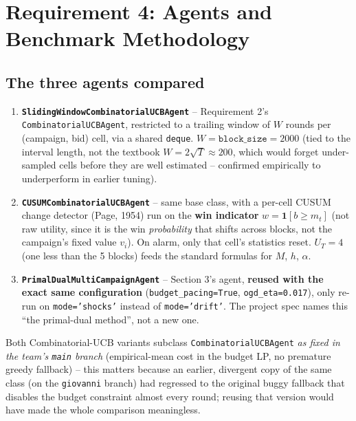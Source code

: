 \documentclass[11pt,a4paper]{article}
\newcommand{\1}{\mathbf{1}}
\begin{document}
\section{Requirement 4: Agents and Benchmark Methodology}

\subsection{The three agents compared}

\begin{enumerate}[leftmargin=1.4em]
  \item \textbf{\texttt{SlidingWindowCombinatorialUCBAgent}} -- Requirement 2's \texttt{CombinatorialUCBAgent}, restricted to a trailing window of $W$ rounds per (campaign, bid) cell, via a shared \texttt{deque}. $W = \texttt{block\_size} = 2000$ (tied to the interval length, not the textbook $W=2\sqrt{T}\approx 200$, which would forget under-sampled cells before they are well estimated -- confirmed empirically to underperform in earlier tuning).
  \item \textbf{\texttt{CUSUMCombinatorialUCBAgent}} -- same base class, with a per-cell CUSUM change detector (Page, 1954) run on the \textbf{win indicator} $w = \1[b\ge m_t]$ (not raw utility, since it is the win \emph{probability} that shifts across blocks, not the campaign's fixed value $v_i$). On alarm, only that cell's statistics reset. $U_T=4$ (one less than the 5 blocks) feeds the standard formulas for $M$, $h$, $\alpha$.
  \item \textbf{\texttt{PrimalDualMultiCampaignAgent}} -- Section 3's agent, \textbf{reused with the exact same configuration} (\texttt{budget\_pacing=True}, \texttt{ogd\_eta=0.017}), only re-run on \texttt{mode='shocks'} instead of \texttt{mode='drift'}. The project spec names this ``the primal-dual method'', not a new one.
\end{enumerate}

Both Combinatorial-UCB variants subclass \texttt{CombinatorialUCBAgent} \emph{as fixed in the team's \texttt{main} branch} (empirical-mean cost in the budget LP, no premature greedy fallback) -- this matters because an earlier, divergent copy of the same class (on the \texttt{giovanni} branch) had regressed to the original buggy fallback that disables the budget constraint almost every round; reusing that version would have made the whole comparison meaningless.
\end{document}
